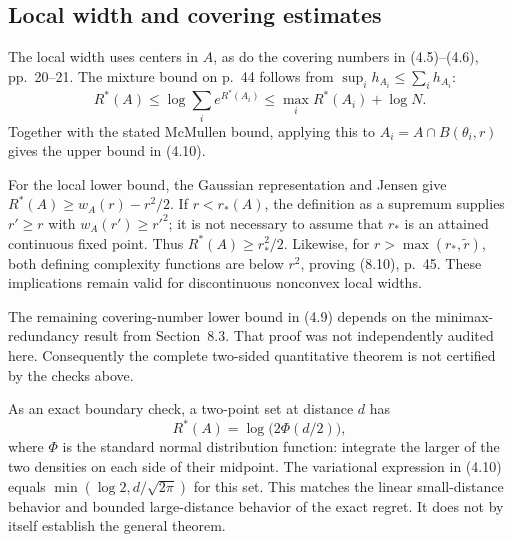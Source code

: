 \documentclass[10pt]{article}
\begin{document}
\subsection*{Local width and covering estimates}
The local width uses centers in \(A\), as do the covering numbers in (4.5)–(4.6), pp. 20–21. The mixture bound on p. 44 follows from \(\sup_i h_{A_i}\le\sum_i h_{A_i}\): \[R^*(A)\le\log\sum_i e^{R^*(A_i)}
 \le\max_iR^*(A_i)+\log N.\] Together with the stated McMullen bound, applying this to \(A_i=A\cap B(\theta_i,r)\) gives the upper bound in (4.10).\par
For the local lower bound, the Gaussian representation and Jensen give \(R^*(A)\ge w_A(r)-r^2/2\). If \(r<r_*(A)\), the definition as a supremum supplies \(r'\ge r\) with \(w_A(r')\ge r'^2\); it is not necessary to assume that \(r_*\) is an attained continuous fixed point. Thus \(R^*(A)\ge r_*^2/2\). Likewise, for \(r>\max(r_*,\widetilde r)\), both defining complexity functions are below \(r^2\), proving (8.10), p. 45. These implications remain valid for discontinuous nonconvex local widths.\par
The remaining covering-number lower bound in (4.9) depends on the minimax-redundancy result from Section 8.3. That proof was not independently audited here. Consequently the complete two-sided quantitative theorem is not certified by the checks above.\par
As an exact boundary check, a two-point set at distance \(d\) has \[R^*(A)=\log\bigl(2\Phi(d/2)\bigr),\] where \(\Phi\) is the standard normal distribution function: integrate the larger of the two densities on each side of their midpoint. The variational expression in (4.10) equals \(\min(\log2,d/\sqrt{2\pi})\) for this set. This matches the linear small-distance behavior and bounded large-distance behavior of the exact regret. It does not by itself establish the general theorem.\par
\end{document}
